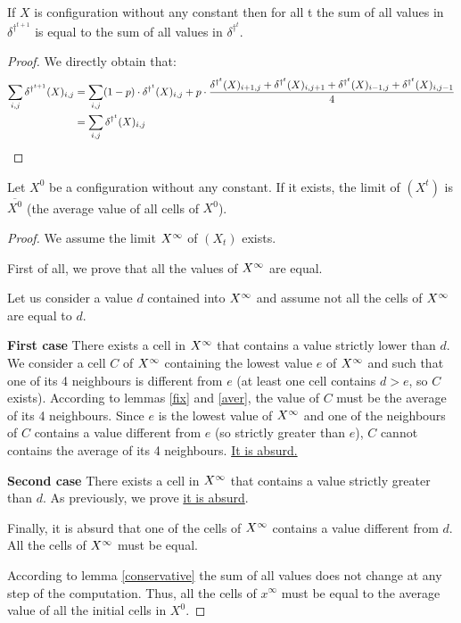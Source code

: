 
\begin{lemma}
  \label{conservative}
  If $X$ is configuration without any constant then for all t the sum of all values in $\delta^{\dag^{t+1}}$ is equal to the sum of all values in $\delta^{\dag^t}$.
\end{lemma}

\begin{proof}
  We directly obtain that:
  \[\begin{split}
    \sum_{i,j} \delta^{\dag^{t+1}}(X)_{i,j} & = \sum_{i,j} (1-p) \cdot \delta^{\dag^t}(X)_{i,j} + p \cdot \frac{\delta^{\dag^t}(X)_{i+1,j} + \delta^{\dag^t}(X)_{i,j+1} + \delta^{\dag^t}(X)_{i-1,j} + \delta^{\dag^t}(X)_{i,j-1}}{4} \\
        & = \sum_{i,j} \delta^{\dag^t}(X)_{i,j}
  \end{split} \]
\end{proof}

\begin{prop}
  \label{limnoc}
  Let $X^0$ be a configuration without any constant. If it exists, the limit of $(X^t)$ is $\overline{X^0}$ (the average value of all cells of $X^0$).
\end{prop}

\begin{proof}
  We assume the limit $X^{\infty}$ of $(X_t)$ exists.
  
  First of all, we prove that all the values of $X^{\infty}$ are equal. 
  
  Let us consider a value $d$ contained into $X^{\infty}$ and assume not all the cells of $X^{\infty}$ are equal to $d$.
  
  \textbf{First case} There exists a cell in $X^{\infty}$ that contains a value strictly lower than $d$. We consider a cell $C$ of $X^{\infty}$ containing the lowest value $e$ of $X^{\infty}$ and such that one of its 4 neighbours is different from $e$ (at least one cell contains $d > e$, so $C$ exists). According to lemmas \ref{fix} and \ref{aver}, the value of $C$ must be the average of its 4 neighbours. Since $e$ is the lowest value of $X^{\infty}$ and one of the neighbours of $C$ contains a value different from $e$ (so strictly greater than $e$), $C$ cannot contains the average of its 4 neighbours. \underline{It is absurd.}

  \textbf{Second case} There exists a cell in $X^{\infty}$ that contains a value strictly greater than $d$. As previously, we prove \underline{it is absurd}.
  
  Finally, it is absurd that one of the cells of $X^{\infty}$ contains a value different from $d$. All the cells of $X^{\infty}$ must be equal.
  
  According to lemma \ref{conservative} the sum of all values does not change at any step of the computation. Thus, all the cells of $x^{\infty}$ must be equal to the average value of all the initial cells in $X^0$.  
\end{proof}

